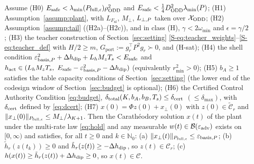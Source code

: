 \begin{theorem}
\label{thm:main}
\label{thm:main_cbf}
Assume
(H0) $E_{\mathrm{safe}} < \lambda_{\min}(P_{\mathrm{full},\epsilon})\rho_{\mathrm{ODD}}^2$ and $E_{\mathrm{safe}} < \frac14D_{\mathrm{ODD}}^2\lambda_{\min}(P)$;
(H1) Assumption~\ref{assump:plant}, with $L_{F_{\mathrm{nl}}}$, $M_\perp$, $L_{\perp,P}$ taken over $\mathcal{X}_{\mathrm{ODD}}$;
(H2) Assumption~\ref{assump:tail} ((H2a)--(H2c)), and in class (H), $\gamma < 2\omega_{\min}$ and $\epsilon = \gamma/2$;
(H3) the teacher construction of Section~\ref{sec:setting} \eqref{S-eq:teacher_weights}--\eqref{S-eq:teacher_def} with $H/2 \ge m$, $G_{\mathrm{port}} := g_r^\top P^2g_r \succ 0$, and (H-sat);
(H4) the shell condition $\varepsilon_{\mathrm{basis},P}^2 + \Delta h_{\mathrm{dip}} + L_hM_zT_s < E_{\mathrm{safe}}$ and $h_{\mathrm{act}} \in (L_hM_zT_s,\ E_{\mathrm{safe}} - \varepsilon_{\mathrm{basis},P}^2 - \Delta h_{\mathrm{dip}})$ (equivalently $r_{\min}^2 > 0$);
(H5) $b_A \ge 1$ satisfies the table capacity conditions of Section~\ref{sec:setting} (the lower end of the codesign window of Section~\ref{sec:budget} is optional);
(H6) the Certified Control Authority Condition \eqref{eq:budget}, $\delta_{\mathrm{total}}(K, b_A, b_B, T_s) \le \delta_{\mathrm{cert}}$ $(\le \delta_{\max})$, with $\delta_{\mathrm{cert}}$ defined by \eqref{eq:dcert};
(H7) $x(0) = \Phi z(0) + x_\perp(0)$ with $z(0) \in \tilde{\mathcal{C}}_r$ and $\|x_\perp(0)\|_{P_{\mathrm{full},\epsilon}} \le M_\perp/\lambda_{K+1}$.
Then the Carath\'eodory solution $x(t)$ of the plant under the multi-rate law \eqref{eq:hold} and any measurable $w(t) \in \mathcal{B}(\varepsilon_{\mathrm{adv}})$ exists on $[0, \infty)$ and satisfies, for all $t \ge 0$ and $k \in \mathbb{N}_0$:
(a) $\|x_\perp(t)\|_{P_{\mathrm{full},\epsilon}} \le \varepsilon_{\mathrm{basis},P}$;
(b) $\tilde h_r(z(t_k)) \ge 0$ and $\tilde h_r(z(t)) \ge -\Delta h_{\mathrm{dip}}$, so $z(t) \in \mathcal{C}_r$;
(c) $h(x(t)) \ge \tilde h_r(z(t)) + \Delta h_{\mathrm{dip}} \ge 0$, so $x(t) \in \mathcal{C}$.
\end{theorem}

